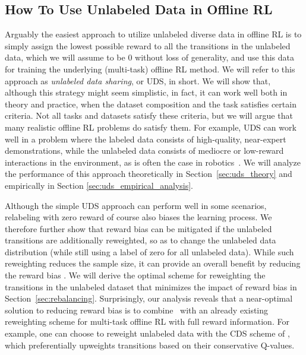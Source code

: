 \vspace{-0.2cm}
\subsection{How To Use Unlabeled Data in Offline RL}
\vspace{-0.2cm}
\label{sec:uds_method}
Arguably the easiest approach to utilize unlabeled diverse data in offline RL is to simply assign the lowest possible reward to all the transitions in the unlabeled data, which we will assume to be $0$ without loss of generality, and use this data for training the underlying (multi-task) offline RL method. We will refer to this approach as \emph{unlabeled data sharing}, or UDS, in short. We will show that, although this strategy might seem simplistic, in fact, it can work well both in theory and practice, when the dataset composition and the task satisfies certain criteria. Not all tasks and datasets satisfy these criteria, but we will argue that many realistic offline RL problems do satisfy them. For example, UDS can work well in a problem where the labeled data consists of high-quality, near-expert demonstrations, while the unlabeled data consists of mediocre or low-reward interactions in the environment, as is often the case in robotics~\citep{xie2019improvisation}. 
We will analyze the performance of this approach theoretically in Section~\ref{sec:uds_theory} and empirically in Section \ref{sec:uds_empirical_analysis}.

Although the simple UDS approach can perform well in some scenarios, relabeling with zero reward of course also biases the learning process. We therefore further show that reward bias can be mitigated if the unlabeled transitions are additionally reweighted, so as to change the unlabeled data distribution (while still using a label of zero for all unlabeled data). While such reweighting reduces the sample size, it can provide an overall benefit by reducing the reward bias . We will derive the optimal scheme for reweighting the transitions in the unlabeled dataset that minimizes the impact of reward bias in Section~\ref{sec:rebalancing}. Surprisingly, our analysis reveals that a near-optimal solution to reducing reward bias is to combine \uds\ with an already existing reweighting scheme for multi-task offline RL with full reward information. For example, one can choose to reweight unlabeled data with the  {CDS} scheme of \citet{yu2021conservative}, which preferentially upweights transitions based on their conservative Q-values.

